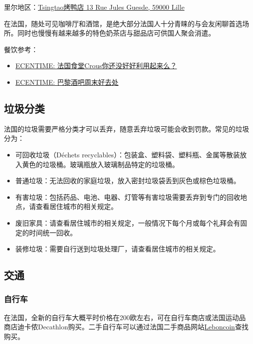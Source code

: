 \documentclass[UTF8]{ctexart}
\begin{document}
里尔地区：\href{https://maps.app.goo.gl/ScHQq7jbV4Bug9JJ7}{Tsingtao烤鸭店 13 Rue Jules Guesde, 59000 Lille}

在法国，随处可见咖啡厅和酒馆，是绝大部分法国人十分青睐的与会友闲聊首选场所。同时也慢慢有越来越多的特色奶茶店与甜品店可供国人聚会消遣。

餐饮参考：
\begin{itemize}
    \item \href{https://www.ecentime.com/article/comment-profider-le-crous-en-france}{ECENTIME: 法国食堂Crous你还没好好利用起来么？}
    
    \item \href{https://www.ecentime.com/article/ecentime-bar-paris}{ECENTIME: 巴黎酒吧周末好去处}
\end{itemize}

\subsection{垃圾分类}

法国的垃圾需要严格分类才可以丢弃，随意丢弃垃圾可能会收到罚款。常见的垃圾分为：

\begin{itemize}
    \item 可回收垃圾（Déchets recyclables）：包装盒、塑料袋、塑料瓶、金属等散装放入黄色的垃圾桶。玻璃瓶放入玻璃制品特定的垃圾桶。
    \item 普通垃圾：无法回收的家庭垃圾，放入密封垃圾袋丢到灰色或棕色垃圾桶。
    \item 有害垃圾：包括药品、电池、电器、灯管等有害垃圾需要丢弃到专门的回收地点，请查看居住城市的相关规定。
    \item 废旧家具：请查看居住城市的相关规定，一般情况下每个月或每个礼拜会有固定的时间统一回收。
    \item 装修垃圾：需要自行送到垃圾处理厂，请查看居住城市的相关规定。
\end{itemize}

\subsection{交通}

\subsubsection{自行车}
在法国，全新的自行车大概平时价格在200欧左右，可在自行车商店或法国运动品商店迪卡侬Decathlon购买。二手自行车可以通过法国二手商品网站\href{https://www.leboncoin.fr/}{Leboncoin}查找购买。
\end{document}
